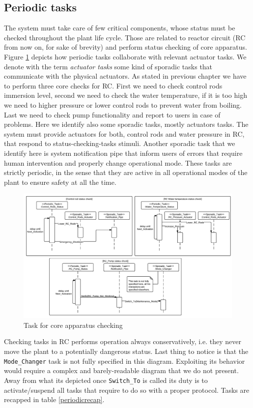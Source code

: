 \documentclass[10pt,a4paper]{report}
\begin{document}
\subsection{Periodic tasks}
The system must take care of few critical components, whose status must be checked
throughout the plant life cycle. Those are related to reactor circuit (RC from now 
on, for sake of brevity) and perform status checking of core apparatus. Figure
\ref{coretask} depicts how periodic tasks collaborate with relevant actuator tasks.
We denote with the term \emph{actuator tasks} some kind of sporadic tasks 
that communicate with the physical actuators. 
As stated in previous chapter we have to perform three core checks for RC. First
we need to check control rods immersion level, second we need to check the water 
temperature, if it is too high we need to higher pressure or lower control rods 
to prevent water from boiling. Last we need to check pump functionality and 
report to users in case of problems. Here we identify also some sporadic 
tasks, mostly actuators tasks. The system must provide actuators for both, 
control rods and water pressure in RC, that respond to status-checking-tasks 
stimuli. Another sporadic task that we identify here is system notification pipe 
that inform users of errors that require human intervention and properly change 
operational mode. These tasks are strictly periodic, in the sense that they 
are active in all operational modes of the plant to ensure safety at all the time. 
\begin{figure}[htb]
\centering
\includegraphics[width=\textwidth]{diagrams/RC_Status_Diagram}
\caption{Task for core apparatus checking}
\label{coretask}
\end{figure}

Checking tasks in RC performs operation always conservatively, i.e. they never 
move the plant to a potentially dangerous status. Last thing to notice is that 
the \texttt{Mode\_Changer} task is not fully specified in this diagram. Exploiting 
its behavior would require a complex and barely-readable diagram that we do not 
present. Away from what its depicted once \texttt{Switch\_To} is called its duty
is to activate/suspend all tasks that require to do so with a proper protocol. 
Tasks are recapped in table \ref{periodicrecap}. 
\end{document}
